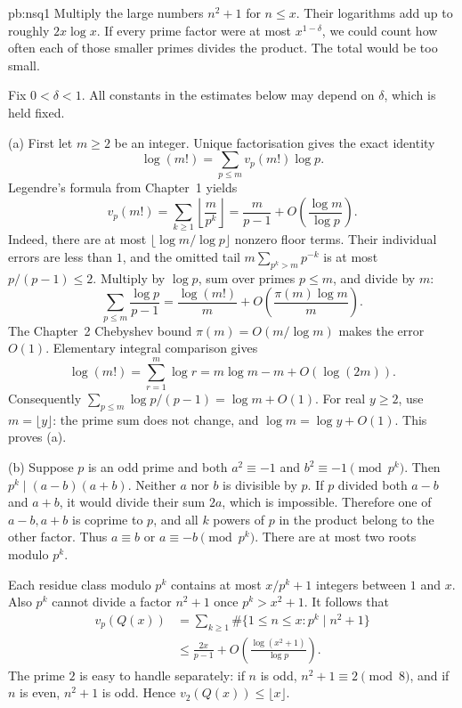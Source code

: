\begin{solution}{pb:nsq1}
\idea Multiply the large numbers $n^2+1$ for $n\le x$.
Their logarithms add up to roughly $2x\log x$.
If every prime factor were at most $x^{1-\delta}$,
we could count how often each of those smaller
primes divides the product. The total would be too small.

\writeup Fix $0<\delta<1$. All constants in the estimates
below may depend on $\delta$, which is held fixed.

(a) First let $m\ge2$ be an integer.
Unique factorisation gives the exact identity
\[
\log(m!)=\sum_{p\le m}v_p(m!)\log p.
\]
Legendre's formula from Chapter~1 yields
\[
v_p(m!)=\sum_{k\ge1}\left\lfloor\frac m{p^k}\right\rfloor
=\frac m{p-1}+O\left(\frac{\log m}{\log p}\right).
\]
Indeed, there are at most $\lfloor\log m/\log p\rfloor$
nonzero floor terms. Their individual errors are
less than $1$, and the omitted tail
$m\sum_{p^k>m}p^{-k}$ is at most $p/(p-1)\le2$.
Multiply by $\log p$, sum over primes $p\le m$,
and divide by $m$:
\[
\sum_{p\le m}\frac{\log p}{p-1}
=\frac{\log(m!)}m
+O\left(\frac{\pi(m)\log m}{m}\right).
\]
The Chapter~2 Chebyshev bound
$\pi(m)=O(m/\log m)$ makes the error $O(1)$.
Elementary integral comparison gives
\[
\log(m!)=\sum_{r=1}^m\log r
=m\log m-m+O(\log(2m)).
\]
Consequently
$\sum_{p\le m}\log p/(p-1)=\log m+O(1)$.
For real $y\ge2$, use $m=\lfloor y\rfloor$:
the prime sum does not change, and
$\log m=\log y+O(1)$. This proves (a).

(b) Suppose $p$ is an odd prime and both
$a^2\equiv-1$ and $b^2\equiv-1\pmod{p^k}$.
Then $p^k\mid(a-b)(a+b)$.
Neither $a$ nor $b$ is divisible by $p$.
If $p$ divided both $a-b$ and $a+b$,
it would divide their sum $2a$, which is
impossible. Therefore one of $a-b,a+b$ is
coprime to $p$, and all $k$ powers of $p$
in the product belong to the other factor.
Thus $a\equiv b$ or $a\equiv-b\pmod{p^k}$.
There are at most two roots modulo $p^k$.

Each residue class modulo $p^k$ contains at most
$x/p^k+1$ integers between $1$ and $x$.
Also $p^k$ cannot divide a factor $n^2+1$
once $p^k>x^2+1$. It follows that
\[
\begin{aligned}
v_p(Q(x))
&=\sum_{k\ge1}\#\{1\le n\le x:p^k\mid n^2+1\}\\
&\le\frac{2x}{p-1}
+O\left(\frac{\log(x^2+1)}{\log p}\right).
\end{aligned}
\]
The prime $2$ is easy to handle separately:
if $n$ is odd, $n^2+1\equiv2\pmod8$,
and if $n$ is even, $n^2+1$ is odd.
Hence $v_2(Q(x))\le\lfloor x\rfloor$.


\end{solution}
